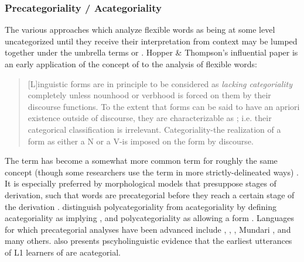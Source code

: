 \subsubsection{Precategoriality / Acategoriality}
\label{sec:2.3.1.4}

The various approaches which analyze flexible words as being at some level uncategorized until they receive their interpretation from context may be lumped together under the umbrella terms  or . Hopper \& Thompson's influential paper \citeyear{HopperThompson1984} is an early application of the concept of  to the analysis of flexible words:

\blockquote[{\cite[747]{HopperThompson1984}}]{[L]inguistic forms are in principle to be considered as \emph{lacking categoriality} completely unless nounhood or verbhood is forced on them by their discourse functions. To the extent that forms can be said to have an apriori existence outside of discourse, they are characterizable as ; i.e. their categorical classification is irrelevant. Categoriality-the realization of a form as either a N or a V-is imposed on the form by discourse.}

The term  has become a somewhat more common term for roughly the same concept (though some researchers use the term in more strictly-delineated ways) \parencites[357, 362--364]{EvansOsada2005}{Bisang2008a}{Bisang2008b}{Bisang2013}. It is especially preferred by morphological models that presuppose stages of derivation, such that words are precategorial before they reach a certain stage of the derivation \parencites{HalleMarantz1993}{Arad2005} . \textcite[5]{VapnarksyVeneziano2017} distinguish polycategoriality from acategoriality by defining acategoriality as implying , and polycategoriality as allowing a form . Languages for which precategorial analyses have been advanced include  \parencite{Haag2017},  \parencite{McGregor2013},  \parencite{FranchettoSantos2017}, Mundari \parencite{HengeveldRijkhoff2005}, and many others. \textcite{Pfeiler2006} also presents pscyholinguistic evidence that the earliest utterances of L1 learners of  are acategorial.

